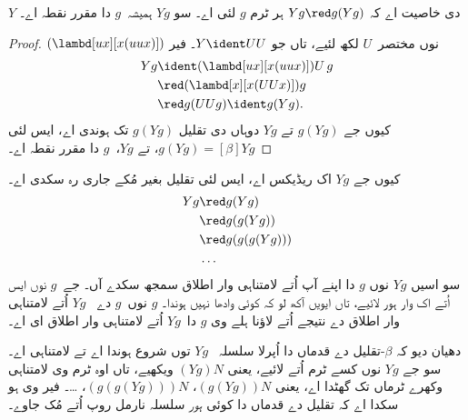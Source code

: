 \documentclass[../../../include/open-logic-section]{subfiles}
\begin{document}
\begin{thm}
  $Y$ دی خاصیت اے کہ $Yg \red g(Yg)$ ہر ٹرم $g$ لئی اے۔
  سو $Yg$ ہمیشہ~$g$ دا مقرر نقطہ اے۔
\end{thm}

\begin{proof}
  $(\lambd[ux][x(uux)])$ نوں مختصر~$U$ لکھ لئیے، تاں جو
  $Y \ident UU$۔ فیر
  \begin{align*}
    Y g &\ident (\lambd[ux][x(uux)])U\,g \\
    &\red (\lambd[x][x(UUx)])g\\
    & \red g(UUg) \ident g(Yg).
  \end{align*}
  کیوں جے $g(Yg)$ تے $Yg$ دوہاں دی تقلیل $g(Yg)$ تک ہوندی اے،
  ایس لئی $g(Yg) \equal[\beta]
  Yg$، تے $Yg$،~$g$ دا مقرر نقطہ اے۔
\end{proof}

کیوں جے $Yg$ اک ریڈیکس اے، ایس لئی تقلیل بغیر مُکے جاری رہ
سکدی اے۔
\begin{align*}
  Y g &\red g (Y g) \\
    &\red g (g (Y g)) \\
    &\red g(g (g (Y g)))\\
    &\ldots
\end{align*}
سو اسیں $Yg$ نوں $g$ دا اپنے آپ اُتے لامتناہی وار اطلاق
سمجھ سکدے آں۔ جے~$g$ نوں ایس اُتے اک وار ہور لائیے، تاں
ایویں آکھ لو کہ کوئی وادھا نہیں ہوندا۔ $g$ نوں~$g$ دے
~$Yg$ اُتے لامتناہی وار اطلاق دے نتیجے اُتے لاؤنا ہلے وی
$g$ دا~$Yg$ اُتے لامتناہی وار اطلاق ای اے۔

دھیان دیو کہ $\beta$-تقلیل دے قدماں دا اُپرلا سلسلہ
~$Yg$ توں شروع ہوندا اے تے لامتناہی اے۔ سو جے $Yg$ نوں
کسے ٹرم اُتے لائیے، یعنی $(Yg)N$ ویکھیے، تاں اوہ ٹرم وی
لامتناہی وکھرے ٹرماں تک گھٹدا اے، یعنی $(g(Yg))N$،
$(g(g(Yg)))N$، \dots۔ فیر وی ہو سکدا اے کہ تقلیل دے
قدماں دا کوئی \emph{ہور} سلسلہ نارمل روپ اُتے مُک جاوے۔
\end{document}
